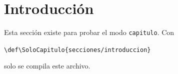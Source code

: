 \section{Introducción}

Esta sección existe para probar el modo \texttt{capitulo}. Con

\smallskip
\noindent\verb|\def\SoloCapitulo{secciones/introduccion}|
\smallskip

\noindent solo se compila este archivo.
